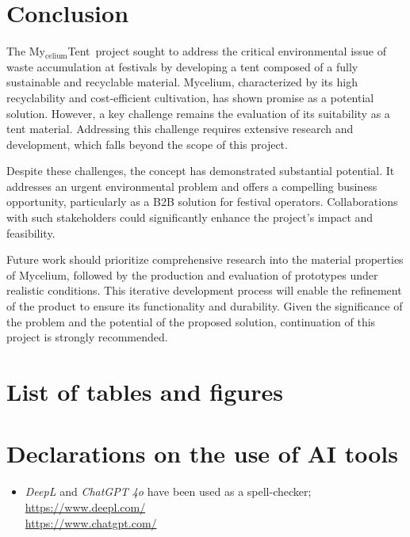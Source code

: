 \documentclass{article}
\newcommand{\myc}{My$_{\text{celium}}$Tent}
\begin{document}
\section{Conclusion}
The \myc\ project sought to address the critical environmental issue of waste
accumulation at festivals by developing a tent composed of a fully sustainable and
recyclable material. Mycelium, characterized by its high recyclability and cost-efficient
cultivation, has shown promise as a potential solution. However, a key challenge remains
the evaluation of its suitability as a tent material. Addressing this challenge requires
extensive research and development, which falls beyond the scope of this project.

Despite these challenges, the concept has demonstrated substantial potential. It addresses
an urgent environmental problem and offers a compelling business opportunity, particularly
as a B2B solution for festival operators. Collaborations with such stakeholders could
significantly enhance the project's impact and feasibility.

Future work should prioritize comprehensive research into the material properties of
Mycelium, followed by the production and evaluation of prototypes under realistic
conditions. This iterative development process will enable the refinement of the
product to ensure its functionality and durability. Given the significance of the problem
and the potential of the proposed solution, continuation of this project is strongly
recommended.

\newpage
\section{List of tables and figures}
\listoftables

\listoffigures

\section{Declarations on the use of AI tools}
\begin{itemize}
    \item \textit{DeepL} and \textit{ChatGPT 4o} have been used as a spell-checker;\\
        \url{https://www.deepl.com/}\\
        \url{https://www.chatgpt.com/}
\end{itemize}

\setlength{\bibitemsep}{1.2\baselineskip}
\printbibliography[heading=none]
\end{document}
